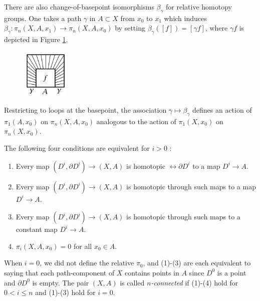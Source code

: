 There are also change-of-basepoint isomorphisms
$\beta_{\gamma}$ for relative homotopy groups.
One takes a path  $\gamma$ in $A \subset X$ from
$x_0$ to $x_1$ which induces
$\beta_{\gamma} \colon \pi_n (X,A,x_1) \to 
\pi_n (X,A,x_0)$ by setting
$\beta_{\gamma} \left( \left[ f \right]  \right) 
= \left[ \gamma f \right] $, where
$\gamma f$ is depicted in 
Figure \ref{fig:DIWIOA-png}.

\begin{figure}[htpb]
    \centering
    \includegraphics[width=0.2\textwidth]{Figures/DIWIOA.png}
    \caption{}
    \label{fig:DIWIOA-png}
\end{figure}

Restricting to loops at the
basepoint, the association $\gamma \mapsto 
\beta_{\gamma}$ defines an action
of $\pi_1 \left( A, x_0 \right) $ on
$\pi_n \left( X, A, x_0 \right) $ analogous to the
action of $\pi_1 \left( X, x_0 \right) $ on
$\pi_n (X,x_0)$.






%

\begin{problem}\label{n-connected-relative}
    The following four conditions are equivalent for
    $i>0$ :
    \begin{enumerate}
        \item Every map
            $\left( D^{i} , \partial D^{i} \right) \to 
            \left( X,A \right) $ is homotopic
            $\rel \partial D^{i}$ to a map $D^{i} \to A$.
        \item Every map $\left( D^{i},\partial D^{i} \right) 
            \to (X,A)$ is homotopic through such maps
            to a map $D^{i} \to A$.
        \item Every map $\left( D^{i}, \partial D^{i} \right) 
            \to \left( X,A \right) $ is homotopic through such
            maps to a constant map $D^{i} \to A$.
        \item $\pi_i \left( X, A, x_0 \right) = 0$ for all
            $x_0 \in A$.
    \end{enumerate}
    When $i = 0$, we did not define the relative $\pi_0$,
    and (1)-(3) are each equivalent to saying that
    each path-component of $X$ contains points
    in $A$ since $D^{0}$ is a point and
    $\partial D^{0}$ is empty. The pair
    $\left( X, A \right) $ is called \textit{$n$-connected}
    if (1)-(4) hold for $0<i\le n$ and
    (1)-(3) hold for  $i=0$.
\end{problem}


